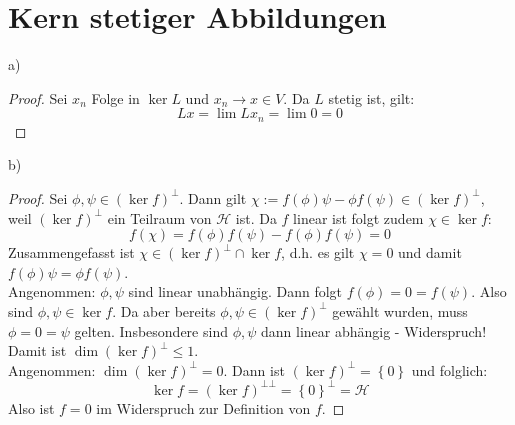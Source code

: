 \documentclass[a4paper,12pt]{article}
\newcommand{\kla}{}
\newcommand{\klammer}{}
\begin{document}
\section{Kern stetiger Abbildungen}
a)
\begin{proof}
Sei $x_n$ Folge in $\ker L$ und $x_n\rightarrow x\in V$. Da $L$ stetig ist, gilt:
$$Lx=\lim Lx_n=\lim 0=0$$
\end{proof}
b)
\begin{proof}
Sei $\phi,\psi\in(\ker f)^\bot$. Dann gilt $\chi:=f(\phi)\psi-\phi f(\psi)\in(\ker f)^\bot$, weil $(\ker f)^\bot$ ein Teilraum von $\mathcal{H}$ ist. Da $f$ linear ist folgt zudem $\chi\in\ker f$:
$$f(\chi)=f(\phi)f(\psi)-f(\phi)f(\psi)=0$$
Zusammengefasst ist $\chi\in (\ker f)^\bot\cap\ker f$, d.h. es gilt $\chi=0$ und damit $f(\phi)\psi=\phi f(\psi)$.\\
Angenommen: $\phi,\psi$ sind linear unabhängig. Dann folgt $f(\phi)=0=f(\psi)$. Also sind $\phi,\psi\in\ker f$. Da aber bereits $\phi,\psi\in(\ker f)^\bot$ gewählt wurden, muss $\phi=0=\psi$ gelten. Insbesondere sind $\phi,\psi$ dann linear abhängig - Widerspruch!\\
Damit ist $\dim(\ker f)^\bot\le 1$. \\
Angenommen: $\dim(\ker f)^\bot=0$. Dann ist $(\ker f)^\bot=\klammer\left\{ {0} \right\}$ und folglich:
$$\ker f=\kla\left( {\ker f} \right)^{\bot\bot}=\klammer\left\{ {0} \right\}^\bot=\mathcal{H}$$
Also ist $f=0$ im Widerspruch zur Definition von $f$.
\end{proof}
\end{document}
